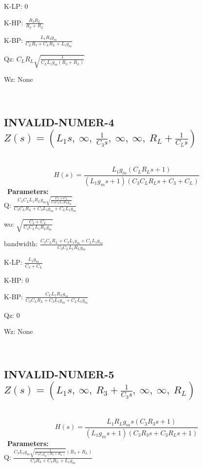 \documentclass{article}
\begin{document}
K-LP: $0$\ 

K-HP: $\frac{R_{3} R_{L}}{R_{3} + R_{L}}$\ 

K-BP: $\frac{L_{1} R_{3} g_{m}}{C_{L} R_{3} + C_{L} R_{L} + L_{1} g_{m}}$\ 

Qz: $C_{L} R_{L} \sqrt{\frac{1}{C_{L} L_{1} g_{m} \left(R_{3} + R_{L}\right)}}$\ 

Wz: $\text{None}$\ 

\ 

\subsection{INVALID-NUMER-4 $Z(s) = \left( L_{1} s, \  \infty, \  \frac{1}{C_{3} s}, \  \infty, \  \infty, \  R_{L} + \frac{1}{C_{L} s}\right)$ } \ 
\textbf{\[H(s) = \frac{L_{1} g_{m} \left(C_{L} R_{L} s + 1\right)}{\left(L_{1} g_{m} s + 1\right) \left(C_{3} C_{L} R_{L} s + C_{3} + C_{L}\right)}\] } \ 
\textbf{Parameters:}\\ 

Q: $\frac{C_{3} C_{L} L_{1} R_{L} g_{m} \sqrt{\frac{C_{3} + C_{L}}{C_{3} C_{L} L_{1} R_{L} g_{m}}}}{C_{3} C_{L} R_{L} + C_{3} L_{1} g_{m} + C_{L} L_{1} g_{m}}$\ 

wo: $\sqrt{\frac{C_{3} + C_{L}}{C_{3} C_{L} L_{1} R_{L} g_{m}}}$\ 

bandwidth: $\frac{C_{3} C_{L} R_{L} + C_{3} L_{1} g_{m} + C_{L} L_{1} g_{m}}{C_{3} C_{L} L_{1} R_{L} g_{m}}$\ 

K-LP: $\frac{L_{1} g_{m}}{C_{3} + C_{L}}$\ 

K-HP: $0$\ 

K-BP: $\frac{C_{L} L_{1} R_{L} g_{m}}{C_{3} C_{L} R_{L} + C_{3} L_{1} g_{m} + C_{L} L_{1} g_{m}}$\ 

Qz: $0$\ 

Wz: $\text{None}$\ 

\ 

\subsection{INVALID-NUMER-5 $Z(s) = \left( L_{1} s, \  \infty, \  R_{3} + \frac{1}{C_{3} s}, \  \infty, \  \infty, \  R_{L}\right)$ } \ 
\textbf{\[H(s) = \frac{L_{1} R_{L} g_{m} s \left(C_{3} R_{3} s + 1\right)}{\left(L_{1} g_{m} s + 1\right) \left(C_{3} R_{3} s + C_{3} R_{L} s + 1\right)}\] } \ 
\textbf{Parameters:}\\ 

Q: $\frac{C_{3} L_{1} g_{m} \sqrt{\frac{1}{C_{3} L_{1} g_{m} \left(R_{3} + R_{L}\right)}} \left(R_{3} + R_{L}\right)}{C_{3} R_{3} + C_{3} R_{L} + L_{1} g_{m}}$\ 
\end{document}
